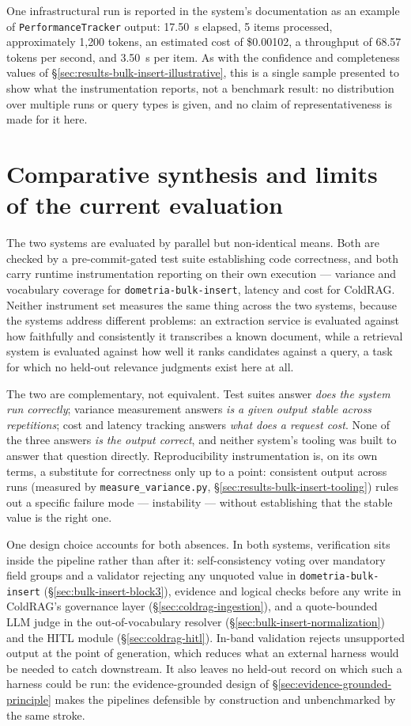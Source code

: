 One infrastructural run is reported in the system's documentation as an example of \texttt{PerformanceTracker} output: 17.50~s elapsed, 5 items processed, approximately 1{,}200 tokens, an estimated cost of \$0.00102, a throughput of 68.57 tokens per second, and 3.50~s per item. As with the confidence and completeness values of \S\ref{sec:results-bulk-insert-illustrative}, this is a single sample presented to show what the instrumentation reports, not a benchmark result: no distribution over multiple runs or query types is given, and no claim of representativeness is made for it here.

\section{Comparative synthesis and limits of the current evaluation}
\label{sec:results-synthesis}

The two systems are evaluated by parallel but non-identical means. Both are checked by a pre-commit-gated test suite establishing code correctness, and both carry runtime instrumentation reporting on their own execution — variance and vocabulary coverage for \texttt{dometria-bulk-insert}, latency and cost for ColdRAG. Neither instrument set measures the same thing across the two systems, because the systems address different problems: an extraction service is evaluated against how faithfully and consistently it transcribes a known document, while a retrieval system is evaluated against how well it ranks candidates against a query, a task for which no held-out relevance judgments exist here at all.

The two are complementary, not equivalent. Test suites answer \emph{does the system run correctly}; variance measurement answers \emph{is a given output stable across repetitions}; cost and latency tracking answers \emph{what does a request cost}. None of the three answers \emph{is the output correct}, and neither system's tooling was built to answer that question directly. Reproducibility instrumentation is, on its own terms, a substitute for correctness only up to a point: consistent output across runs (measured by \texttt{measure\_variance.py}, \S\ref{sec:results-bulk-insert-tooling}) rules out a specific failure mode — instability — without establishing that the stable value is the right one.

One design choice accounts for both absences. In both systems, verification sits inside the pipeline rather than after it: self-consistency voting over mandatory field groups and a validator rejecting any unquoted value in \texttt{dometria-bulk-insert} (\S\ref{sec:bulk-insert-block3}), evidence and logical checks before any write in ColdRAG's governance layer (\S\ref{sec:coldrag-ingestion}), and a quote-bounded LLM judge in the out-of-vocabulary resolver (\S\ref{sec:bulk-insert-normalization}) and the HITL module (\S\ref{sec:coldrag-hitl}). In-band validation rejects unsupported output at the point of generation, which reduces what an external harness would be needed to catch downstream. It also leaves no held-out record on which such a harness could be run: the evidence-grounded design of \S\ref{sec:evidence-grounded-principle} makes the pipelines defensible by construction and unbenchmarked by the same stroke.

